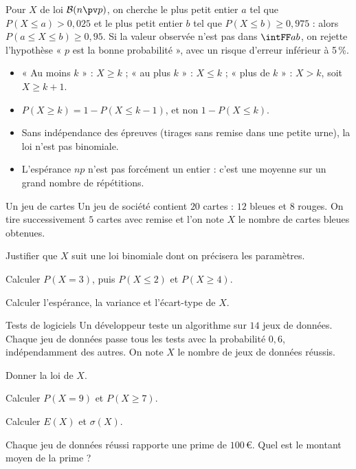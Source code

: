 \begin{savoirfaire}
Pour $X$ de loi $\mathcal{B}(n\pv p)$, on cherche le plus petit entier $a$ tel que $P(X\leq a)>0{,}025$ et le plus petit entier $b$
tel que $P(X\leq b)\geq0{,}975$ : alors $P(a\leq X\leq b)\geq0{,}95$. Si la valeur observée n'est pas dans $\intFF ab$, on rejette
l'hypothèse « $p$ est la bonne probabilité », avec un risque d'erreur inférieur à 5\,\%.
\end{savoirfaire}

\begin{attention}
\begin{itemize}[label={\color{otOrange}\textbullet},leftmargin=1.4em,itemsep=0.6mm,topsep=0.5mm]
  \item « Au moins $k$ » : $X\geq k$ ; « au plus $k$ » : $X\leq k$ ; « plus de $k$ » : $X>k$, soit $X\geq k+1$.
  \item $P(X\geq k)=1-P(X\leq k-1)$, et non $1-P(X\leq k)$.
  \item Sans indépendance des épreuves (tirages sans remise dans une petite urne), la loi n'est pas binomiale.
  \item L'espérance $np$ n'est pas forcément un entier : c'est une moyenne sur un grand nombre de répétitions.
\end{itemize}
\end{attention}

\exercices
{}

\begin{exercice}[1]{Un jeu de cartes}
Un jeu de société contient $20$ cartes : $12$ bleues et $8$ rouges. On tire successivement $5$ cartes avec remise et l'on note $X$
le nombre de cartes bleues obtenues.
\begin{questions}
  \item Justifier que $X$ suit une loi binomiale dont on précisera les paramètres.
  \item Calculer $P(X=3)$, puis $P(X\leq2)$ et $P(X\geq4)$.
  \item Calculer l'espérance, la variance et l'écart-type de $X$.
\end{questions}
\end{exercice}

\begin{exercice}[1]{Tests de logiciels}
Un développeur teste un algorithme sur $14$ jeux de données. Chaque jeu de données passe tous les tests avec la probabilité
$0{,}6$, indépendamment des autres. On note $X$ le nombre de jeux de données réussis.
\begin{questions}
  \item Donner la loi de $X$.
  \item Calculer $P(X=9)$ et $P(X\geq7)$.
  \item Calculer $E(X)$ et $\sigma(X)$.
  \item Chaque jeu de données réussi rapporte une prime de $100$\,€. Quel est le montant moyen de la prime ?
\end{questions}
\end{exercice}

